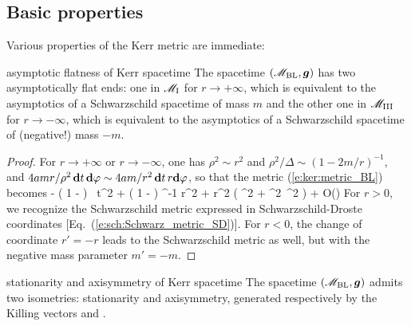 \subsection{Basic properties} \label{s:ker:basic_prop}

Various properties of the Kerr metric are immediate:

\begin{tprop}{asymptotic flatness of Kerr spacetime}{}
The spacetime $(\mathscr{M}_{\rm BL},\bm{g})$ has two asymptotically flat ends: one in
$\mathscr{M}_{\rm I}$ for $r\rightarrow + \infty$, which is equivalent to the asymptotics
of a Schwarzschild spacetime of mass $m$ and the other one
in $\mathscr{M}_{\rm III}$ for $r\rightarrow - \infty$, which is equivalent to
the asymptotics of a Schwarzschild spacetime of (negative!) mass $-m$.
\end{tprop}

\begin{proof}
For $r\rightarrow+\infty$ or $r\rightarrow-\infty$, one has $\rho^2\sim r^2$ and
$\rho^2/\Delta \sim (1-2m/r)^{-1}$,
and $4 a m  r / \rho^2\,  \mathbf{d} t\, \mathbf{d}\varphi \sim 4 a m/r^2 \,  \mathbf{d} t\, r\mathbf{d}\varphi$,
so that the metric (\ref{e:ker:metric_BL}) becomes
\be \label{e:ker:asympt_metric}
      \simeq  - \left( 1 -  \right) \, \dd t^2
    + \left( 1 -  \right) ^{-1} \dd r^2
    + r^2 \left( \dd \th^2 + \sin^2\th  \, \dd \ph^2 \right)
    + O\left(\right)
\ee
For $r>0$, we recognize the Schwarzschild metric expressed
in Schwarzschild-Droste coordinates [Eq.~(\ref{e:sch:Schwarz_metric_SD})].
For $r<0$, the change of coordinate $r'=-r$ leads to the Schwarzschild metric
as well, but with the negative mass parameter $m'=-m$.
\end{proof}

\begin{tprop}{stationarity and axisymmetry of Kerr spacetime}{}
The spacetime $(\mathscr{M}_{\rm BL},\bm{g})$ admits two isometries:
stationarity and axisymmetry, generated respectively by the Killing
vectors
\be \label{e:ker:def_xi_eta}
     \quad\mbox{and}\quad
    \encadre{\w{\eta} := \wpar_\ph}.
\ee
\end{tprop}

